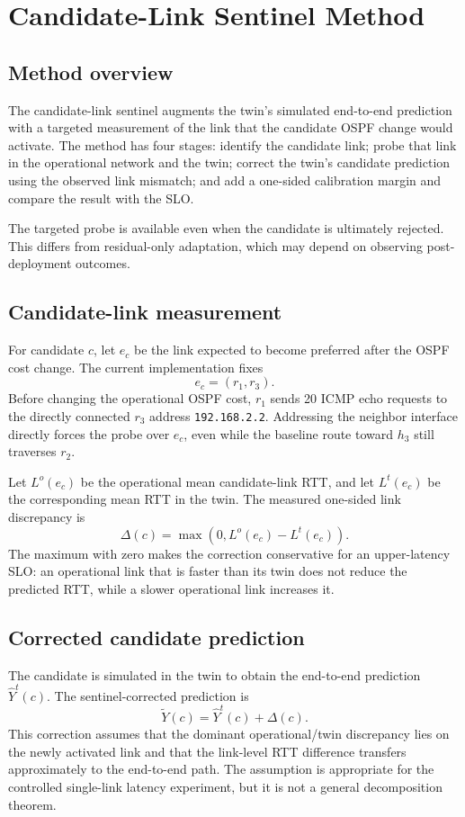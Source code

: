 \section{Candidate-Link Sentinel Method}

\subsection{Method overview}

The candidate-link sentinel augments the twin's simulated end-to-end prediction with a targeted measurement of the link that the candidate OSPF change would activate. The method has four stages: identify the candidate link; probe that link in the operational network and the twin; correct the twin's candidate prediction using the observed link mismatch; and add a one-sided calibration margin and compare the result with the SLO.

The targeted probe is available even when the candidate is ultimately rejected. This differs from residual-only adaptation, which may depend on observing post-deployment outcomes.

\subsection{Candidate-link measurement}

For candidate $c$, let $e_c$ be the link expected to become preferred after the OSPF cost change. The current implementation fixes
\[
e_c=(r_1,r_3).
\]
Before changing the operational OSPF cost, $r_1$ sends 20 ICMP echo requests to the directly connected $r_3$ address \texttt{192.168.2.2}. Addressing the neighbor interface directly forces the probe over $e_c$, even while the baseline route toward $h_3$ still traverses $r_2$.

Let $L^o(e_c)$ be the operational mean candidate-link RTT, and let $L^t(e_c)$ be the corresponding mean RTT in the twin. The measured one-sided link discrepancy is
\[
\Delta(c)=\max\left(0,L^o(e_c)-L^t(e_c)\right).
\]
The maximum with zero makes the correction conservative for an upper-latency SLO: an operational link that is faster than its twin does not reduce the predicted RTT, while a slower operational link increases it.

\subsection{Corrected candidate prediction}

The candidate is simulated in the twin to obtain the end-to-end prediction $\widehat{Y}^{t}(c)$. The sentinel-corrected prediction is
\[
\widetilde{Y}(c)=\widehat{Y}^{t}(c)+\Delta(c).
\]
This correction assumes that the dominant operational/twin discrepancy lies on the newly activated link and that the link-level RTT difference transfers approximately to the end-to-end path. The assumption is appropriate for the controlled single-link latency experiment, but it is not a general decomposition theorem.

